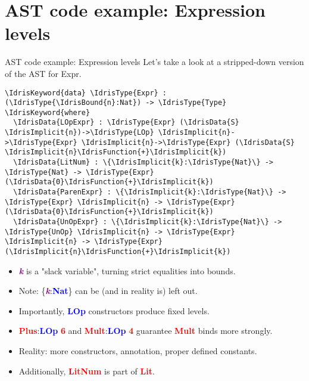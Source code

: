 \documentclass
  [ department=icis
  , notes={show notes}
  , slidesperpage=1
  , nohandout
  , official=true
  ] {beamerruhuisstijl}
\newcommand{\IdrisData}[1]{\textbf{\textcolor{red}{#1}}}
\newcommand{\IdrisType}[1]{\textbf{\textcolor{blue}{#1}}}
\newcommand{\IdrisBound}[1]{\textbf{\textcolor{purple}{#1}}}
\newcommand{\IdrisFunction}[1]{\textbf{\textcolor[RGB]{30,150,10}{#1}}}
\newcommand{\IdrisKeyword}[1]{{\underline{#1}}}
\newcommand{\IdrisImplicit}[1]{{\itshape \IdrisBound{#1}}}
\newcommand{\fframeAndSection}[1]{\section{#1}\begin{frame}[fragile]{#1}}
\begin{document}
\fframeAndSection{AST code example: Expression levels}
\onslide<+->
\onslide<+->
Let's take a look at a stripped-down version of the AST for Expr.
\onslide<+->
\begin{Verbatim}[commandchars=\\\{\}]
\IdrisKeyword{data} \IdrisType{Expr} : (\IdrisType{\IdrisBound{n}:Nat}) -> \IdrisType{Type} \IdrisKeyword{where}
  \IdrisData{LOpExpr} : \IdrisType{Expr} (\IdrisData{S} \IdrisImplicit{n})->\IdrisType{LOp} \IdrisImplicit{n}->\IdrisType{Expr} \IdrisImplicit{n}->\IdrisType{Expr} (\IdrisData{S} \IdrisImplicit{n}\IdrisFunction{+}\IdrisImplicit{k})
  \IdrisData{LitNum} : \{\IdrisImplicit{k}:\IdrisType{Nat}\} -> \IdrisType{Nat} -> \IdrisType{Expr} (\IdrisData{0}\IdrisFunction{+}\IdrisImplicit{k})
  \IdrisData{ParenExpr} : \{\IdrisImplicit{k}:\IdrisType{Nat}\} -> \IdrisType{Expr} \IdrisImplicit{n} -> \IdrisType{Expr} (\IdrisData{0}\IdrisFunction{+}\IdrisImplicit{k})
  \IdrisData{UnOpExpr} : \{\IdrisImplicit{k}:\IdrisType{Nat}\} -> \IdrisType{UnOp} \IdrisImplicit{n} -> \IdrisType{Expr} \IdrisImplicit{n} -> \IdrisType{Expr} (\IdrisImplicit{n}\IdrisFunction{+}\IdrisImplicit{k})
\end{Verbatim}
\onslide<+->
\begin{itemize}
    \item \IdrisImplicit{k} is a "slack variable", turning strict equalities into bounds.
\onslide<+->
    \item Note: \{\IdrisImplicit{k}:\IdrisType{Nat}\} can be (and in reality is) left out.
\onslide<+->
    \item Importantly, \IdrisType{LOp} constructors produce fixed levels.
\onslide<+->
    \item \IdrisData{Plus}:\IdrisType{LOp} \IdrisData{6} and
        \IdrisData{Mult}:\IdrisType{LOp} \IdrisData{4} guarantee
        \IdrisData{Mult} binds more strongly.
\onslide<+->
    \item Reality: more constructors, annotation, proper defined constants.
\onslide<+->
    \item Additionally, \IdrisData{LitNum} is part of \IdrisData{Lit}.
\end{itemize}
\end{frame}
\end{document}
